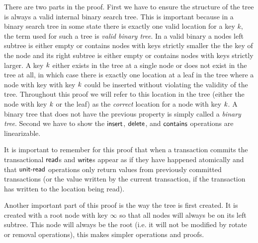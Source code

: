 There are two parts in the proof.
First we have to ensure the structure of the tree is always a valid internal binary search tree.
This is important because in a binary search tree in some state there is exactly one valid location for a key $k$, the term used for such a tree is \emph{valid binary tree}.
In a valid binary a nodes left subtree is either empty or contains nodes with keys strictly smaller the the key of the node and its right subtree
is either empty or contains nodes with keys strictly larger.
A key $\ms{k}$ either exists in the tree at a single node or does not exist in the tree at all, in which case there is exactly one location at a leaf in the tree
where a node with key with key $\ms{k}$ could be inserted without violating the validity of the tree.
Throughout this proof we will refer to this location in the tree (either the node with key $\ms{k}$ or the leaf)
as the \emph{correct} location for a node with key $\ms{k}$.
A binary tree that does not have the previous property is simply called a \emph{binary tree}.
Second we have to show the $\act{insert}$, $\act{delete}$, and $\act{contains}$ operations are linearizable.

It is important to remember for this proof that when a transaction commits the transactional $\lit{read}$s and $\lit{write}$s appear as if they have happened atomically
and that $\lit{unit-read}$ operations only return values from previously committed transactions (or the value written by the current transaction, if the transaction has written to the location being read).

Another important part of this proof is the way the tree is first created.
It is created with a root node with key $\infty$ so that all nodes will always be on its left subtree.
This node will always be the root (i.e. it will not be modified by rotate or removal operations), this makes simpler operations and proofs.


